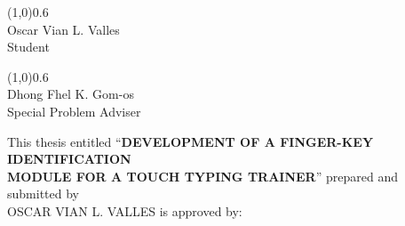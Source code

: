 \documentclass{report}
\begin{document}
\begin{center}
	\line(1,0){0.6\textwidth}\\
	Oscar Vian L. Valles\\
	Student
	\par\vspace{0.5cm}

	\line(1,0){0.6\textwidth}\\
	Dhong Fhel K. Gom-os\\
	Special Problem Adviser

	\vfill
	\hspace{0pt}

\end{center}

\newpage

\noindent
This thesis entitled ``\textbf{\uppercase{Development of a finger-key
		identification \\module for a touch typing trainer}}'' prepared and
submitted by \\\uppercase{Oscar Vian L. Valles} is approved by:

\par\vspace{2cm}
\end{document}
